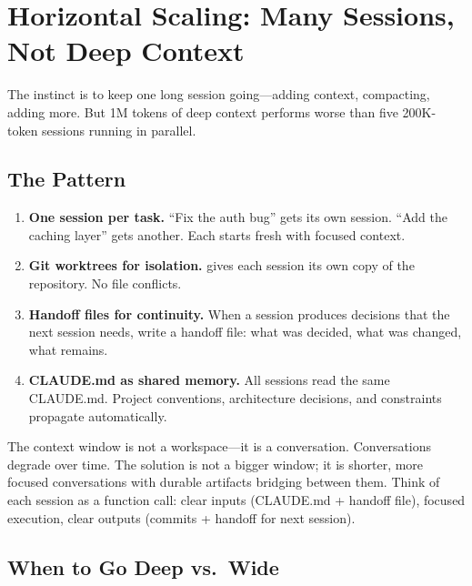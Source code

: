 \section{Horizontal Scaling: Many Sessions, Not Deep Context}
\label{sec:horizontal-scaling}


The instinct is to keep one long session going---adding context,
compacting, adding more. But 1M tokens of deep context performs
worse than five 200K-token sessions running in parallel.

\subsection*{The Pattern}

\begin{enumerate}
  \item \textbf{One session per task.} ``Fix the auth bug'' gets its
    own session. ``Add the caching layer'' gets another. Each starts
    fresh with focused context.
  \item \textbf{Git worktrees for isolation.} 
    gives each session its own copy of the repository. No file conflicts.
  \item \textbf{Handoff files for continuity.} When a session produces
    decisions that the next session needs, write a handoff file:
    what was decided, what was changed, what remains.
  \item \textbf{CLAUDE.md as shared memory.} All sessions read the
    same CLAUDE.md. Project conventions, architecture decisions, and
    constraints propagate automatically.
\end{enumerate}

\begin{keyinsight}
The context window is not a workspace---it is a conversation.
Conversations degrade over time. The solution is not a bigger window;
it is shorter, more focused conversations with durable artifacts
bridging between them. Think of each session as a function call:
clear inputs (CLAUDE.md + handoff file), focused execution, clear
outputs (commits + handoff for next session).
\end{keyinsight}

\subsection*{When to Go Deep vs.\ Wide}

